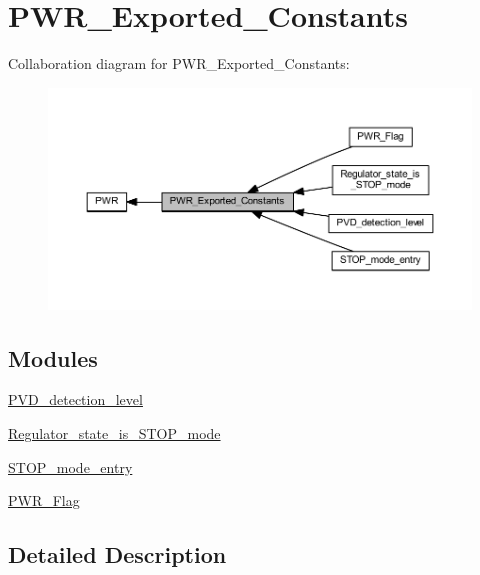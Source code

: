 \hypertarget{group___p_w_r___exported___constants}{}\section{P\+W\+R\+\_\+\+Exported\+\_\+\+Constants}
\label{group___p_w_r___exported___constants}
Collaboration diagram for P\+W\+R\+\_\+\+Exported\+\_\+\+Constants\+:
\nopagebreak
\begin{figure}[H]
\begin{center}
\leavevmode
\includegraphics[width=350pt]{group___p_w_r___exported___constants}
\end{center}
\end{figure}
\subsection*{Modules}
\begin{DoxyCompactItemize}
\item 
\hyperlink{group___p_v_d__detection__level}{P\+V\+D\+\_\+detection\+\_\+level}
\item 
\hyperlink{group___regulator__state__is___s_t_o_p__mode}{Regulator\+\_\+state\+\_\+is\+\_\+\+S\+T\+O\+P\+\_\+mode}
\item 
\hyperlink{group___s_t_o_p__mode__entry}{S\+T\+O\+P\+\_\+mode\+\_\+entry}
\item 
\hyperlink{group___p_w_r___flag}{P\+W\+R\+\_\+\+Flag}
\end{DoxyCompactItemize}


\subsection{Detailed Description}
